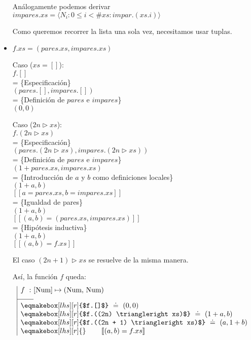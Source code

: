 \documentclass[12pt]{article}
\begin{document}
\begin{itemize}
    Análogamente podemos derivar $impares.xs = \langle N_i : 0 \le i < \#xs : impar.(xs.i) \rangle$

    \bigbreak

    Como queremos recorrer la lista una sola vez, necesitamos usar tuplas.

    \item $f.xs = (pares.xs, impares.xs)$

    \bigbreak

    Caso ($xs = []$):\\
    $f.[]$\\
    = \{Especificación\}\\
    $(pares.[], impares.[])$\\
    = \{Definición de $pares$ e $impares$\}\\
    $(0, 0)$

    \bigbreak

    Caso ($2n \triangleright xs$):\\
    $f.(2n \triangleright xs)$\\
    = \{Especificación\}\\
    $(pares.(2n \triangleright xs), impares.(2n \triangleright xs))$\\
    = \{Definición de $pares$ e $impares$\}\\
    $(1 + pares.xs, impares.xs)$\\
    = \{Introducción de $a$ y $b$ como definiciones locales\}\\
    $(1 + a, b)$\\
    $[\![a = pares.xs, b = impares.xs ]\!]$\\
    = \{Igualdad de pares\}\\
    $(1 + a, b)$\\
    $[\![(a, b) = (pares.xs, impares.xs) ]\!]$\\
    = \{Hipótesis inductiva\}\\
    $(1 + a, b)$\\
    $[\![(a, b) = f.xs ]\!]$

    \bigbreak

    El caso $(2n + 1) \triangleright xs$ se resuelve de la misma manera.

    \bigbreak

    Así, la función $f$ queda:
    \[
    \begin{array}{| r @{} l }
        \rule[-10pt]{0pt}{0pt}f ~ : ~ & [\text{Num}] \mapsto \text{(Num, Num)} \\
        \cline{1-1}
        \multicolumn{2}{|l}{\rule{0pt}{12pt}\eqmakebox[lhs][r]{$f.[]$} ~ \doteq ~ (0, 0)} \\
        \multicolumn{2}{|l}{\eqmakebox[lhs][r]{$f.((2n) \triangleright xs)$} ~ \doteq ~ (1 + a, b)} \\
        \multicolumn{2}{|l}{\eqmakebox[lhs][r]{$f.((2n + 1) \triangleright xs)$} ~ \doteq ~ (a, 1 + b)} \\
        \multicolumn{2}{|l}{\eqmakebox[lhs][r]{} ~  ~ \hspace*{15px}[\![(a, b) = f.xs]\!]}
    \end{array}
    \]

\end{itemize}
\end{document}
